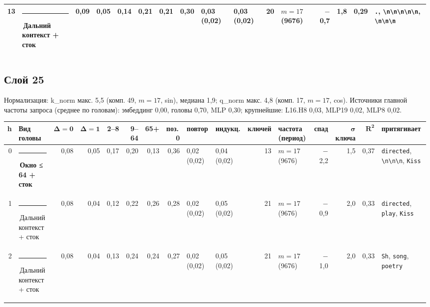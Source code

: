 \documentclass[10pt]{article}
\begin{document}
\begin{minipage}{\linewidth}
\begin{center}
{\begin{tabular}{|r|l|r|r|r|r|r|r|l|l|r|l|r|r|r|l|}
13 & \textcolor[HTML]{C3C2B7}{\rule{0.62em}{0.62em}}\,Дальний контекст + сток & 0,09 & 0,05 & 0,14 & 0,21 & 0,21 & 0,30 & 0,03 (0,02) & 0,03 (0,02) & 20 & $m{=}17$ (9676) & $-$0,7 & 1,8 & 0,29 & \texttt{\textvisiblespace{}.}, \texttt{\textbackslash{}n\textbackslash{}n\textbackslash{}n\textbackslash{}n\textbackslash{}n}, \texttt{\textvisiblespace{}\textbackslash{}n\textbackslash{}n\textbackslash{}n} \\ \hline
\hline\end{tabular}}\end{center}
\end{minipage}
\par\vspace{0.4em}
\noindent\begin{minipage}{\linewidth}
\subsection*{Слой 25}
{\small\color{ink2} Нормализация: k\_norm макс. 5,5 (комп. 49, $m{=}17$, sin), медиана 1,9; q\_norm макс. 4,8 (комп. 17, $m{=}17$, cos). Источники главной частоты запроса (среднее по головам): эмбеддинг 0,00, головы 0,70, MLP 0,30; крупнейшие: L16.H8 0,03, MLP19 0,02, MLP8 0,02.}
\begin{center}{\footnotesize\begin{tabular}{|r|l|r|r|r|r|r|r|l|l|r|l|r|r|r|l|}
\hline
\rowcolor{head}\textbf{h} & \textbf{Вид головы} & $\boldsymbol{\Delta{=}0}$ & $\boldsymbol{\Delta{=}1}$ & \textbf{2–8} & \textbf{9–64} & \textbf{65+} & \textbf{поз.\,0} & \textbf{повтор} & \textbf{индукц.} & \textbf{ключей} & \textbf{частота (период)} & \textbf{спад} & $\boldsymbol{\sigma}$ \textbf{ключа} & $\boldsymbol{R^2}$ & \textbf{притягивает} \\ \hline
0 & \textcolor[HTML]{EDA100}{\rule{0.62em}{0.62em}}\,\textbf{Окно ≤ 64 + сток} & 0,08 & 0,05 & 0,17 & 0,20 & 0,13 & 0,36 & 0,02 (0,02) & 0,04 (0,02) & 13 & $m{=}17$ (9676) & $-$2,2 & 1,5 & 0,37 & \texttt{\textvisiblespace{}directed}, \texttt{\textvisiblespace{}\textbackslash{}n\textbackslash{}n\textbackslash{}n}, \texttt{\textvisiblespace{}Kiss} \\ \hline
1 & \textcolor[HTML]{C3C2B7}{\rule{0.62em}{0.62em}}\,Дальний контекст + сток & 0,08 & 0,04 & 0,12 & 0,22 & 0,26 & 0,28 & 0,02 (0,02) & 0,05 (0,02) & 21 & $m{=}17$ (9676) & $-$0,9 & 2,0 & 0,33 & \texttt{\textvisiblespace{}directed}, \texttt{\textvisiblespace{}play}, \texttt{\textvisiblespace{}Kiss} \\ \hline
2 & \textcolor[HTML]{C3C2B7}{\rule{0.62em}{0.62em}}\,Дальний контекст + сток & 0,08 & 0,04 & 0,13 & 0,24 & 0,24 & 0,27 & 0,02 (0,02) & 0,05 (0,02) & 21 & $m{=}17$ (9676) & $-$1,0 & 2,0 & 0,33 & \texttt{\textvisiblespace{}Sh}, \texttt{\textvisiblespace{}song}, \texttt{\textvisiblespace{}poetry} \\ \hline

\end{tabular}}
\end{center}
\end{minipage}
\end{document}
